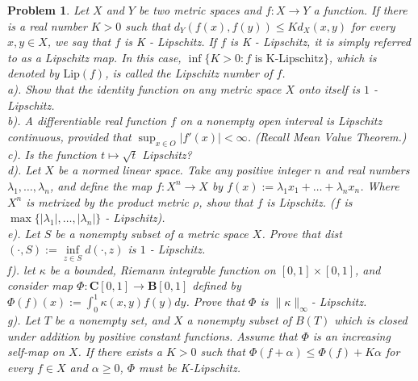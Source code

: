 \documentclass[12pt]{article}
\newtheorem{problem}{Problem}
\begin{document}
\begin{problem}
Let $X$ and $Y$ be two metric spaces and $f: X\to Y$ a function. If there is a real number $K>0$ such that $d_{Y}(f(x), f(y))\leq Kd_{X}(x,y)$ for every $x,y\in X$, we say that $f$ is K - Lipschitz. If $f$ is K - Lipschitz, it is simply referred to as a Lipschitz map. In this case, $\inf\{K>0: f\text{ is K-Lipschitz}\}$, which is denoted by $\text{Lip}(f)$, is called the Lipschitz number of $f$. \\
\indent a). Show that the identity function on any metric space $X$ onto itself is $1$ - Lipschitz. \\
\indent b). A differentiable real function $f$ on a nonempty open interval is Lipschitz continuous, provided that $\sup_{x\in O}|f'(x)|<\infty$. (Recall Mean Value Theorem.) \\
\indent c). Is the function $t\mapsto \sqrt{t}$ Lipschitz? \\
\indent d). Let $X$ be a normed linear space. Take any positive integer $n$ and real numbers $\lambda_{1}, \dots, \lambda_{n}$, and define the map $f: X^{n}\to X$ by $f(x):=\lambda_{1}x_{1}+\dots+\lambda_{n}x_{n}$. Where $X^{n}$ is metrized by the product metric $\rho$, show that $f$ is Lipschitz. ($f$ is $\max\{|\lambda_{1}|, \dots, |\lambda_{n}|\}$ - Lipschitz). \\
\indent e). Let $S$ be a nonempty subset of a metric space $X$. Prove that dist $(\cdot, S):= \inf\limits_{z\in S}d(\cdot ,z)$ is $1$ - Lipschitz. \\
\indent f). let $\kappa$ be a bounded, Riemann integrable function on $[0,1]\times[0,1]$, and consider map $\Phi:\mathbf{C}[0, 1]\to \mathbf{B}[0, 1]$ defined by $\Phi(f)(x):=\int_{0}^{1}\kappa(x,y)f(y)dy$. Prove that $\Phi$ is $\|\kappa\|_{\infty}$- Lipschitz. \\
\indent g). Let $T$ be a nonempty set, and $X$ a nonempty subset of $B(T)$ which is closed under addition by positive constant functions. Assume that $\Phi$ is an increasing self-map on $X$. If there exists a $K>0$ such that $\Phi(f+\alpha)\leq \Phi(f)+K\alpha$ for every $f\in X$ and $\alpha\geq 0$, $\Phi$ must be K-Lipschitz.
\end{problem}
\end{document}
